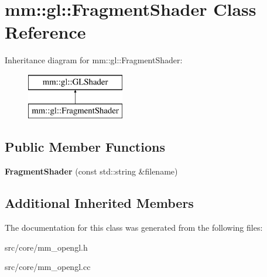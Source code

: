 \hypertarget{classmm_1_1gl_1_1_fragment_shader}{}\section{mm\+:\+:gl\+:\+:Fragment\+Shader Class Reference}
\label{classmm_1_1gl_1_1_fragment_shader}
Inheritance diagram for mm\+:\+:gl\+:\+:Fragment\+Shader\+:\begin{figure}[H]
\begin{center}
\leavevmode
\includegraphics[height=2.000000cm]{classmm_1_1gl_1_1_fragment_shader}
\end{center}
\end{figure}
\subsection*{Public Member Functions}
\begin{DoxyCompactItemize}
\item 
\hypertarget{classmm_1_1gl_1_1_fragment_shader_a99eedc23f36c77fce19d68189f20a8d2}{}{\bfseries Fragment\+Shader} (const std\+::string \&filename)\label{classmm_1_1gl_1_1_fragment_shader_a99eedc23f36c77fce19d68189f20a8d2}

\end{DoxyCompactItemize}
\subsection*{Additional Inherited Members}


The documentation for this class was generated from the following files\+:\begin{DoxyCompactItemize}
\item 
src/core/mm\+\_\+opengl.\+h\item 
src/core/mm\+\_\+opengl.\+cc\end{DoxyCompactItemize}
